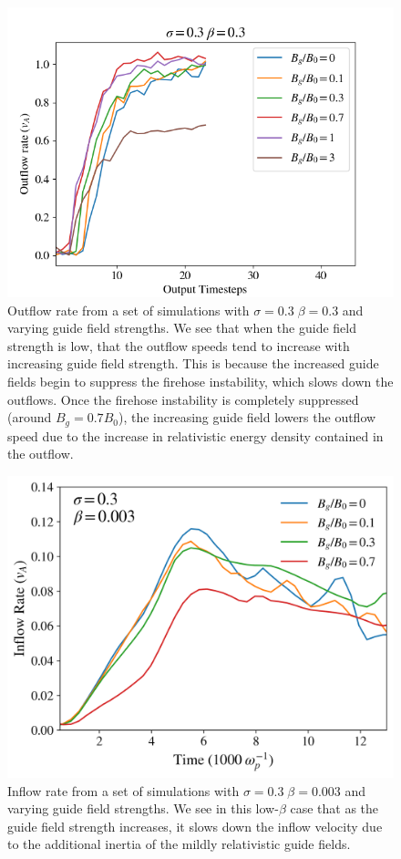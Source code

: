 \documentclass[iop,twocolappendix]{emulateapj}
\begin{document}
\begin{figure}[!h]
	\includegraphics[width=\linewidth]{sig_3_highbeta_outflows_sweetspot.png}
	\caption{Outflow rate from a set of simulations with $\sigma=0.3 \; \beta=0.3$ and varying guide field strengths.  We see that when the guide field strength is low, that the outflow speeds tend to increase with increasing guide field strength.  This is because the increased guide fields begin to suppress the firehose instability, which slows down the outflows.  Once the firehose instability is completely suppressed (around  $B_{g}=0.7B_{0}$), the increasing guide field lowers the outflow speed due to the increase in relativistic energy density contained in the outflow.
	}
	\label{sig.3_highbeta_outflows}
\end{figure}


\begin{figure}[!h]
	\includegraphics[width=\linewidth]{sig_3_lowbeta_inflows.png}
	\caption{Inflow rate from a set of simulations with $\sigma=0.3 \; \beta=0.003$ and varying guide field strengths.  We see in this low-$\beta$ case that as the guide field strength increases, it slows down the inflow velocity due to the additional inertia of the mildly relativistic guide fields.
	}
	\label{sig.3_lowbeta_inflows}
\end{figure}
\end{document}
